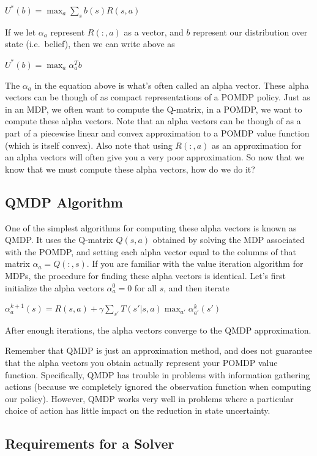 \documentclass[12pt,]{article}
\begin{document}
\(U^{*}(b) = \max_{a} \sum_{s} b(s)R(s,a)\)

If we let \(\alpha_{a}\) represent \(R(:,a)\) as a vector, and \(b\)
represent our distribution over state (i.e.~belief), then we can write
above as

\(U^{*}(b) = \max_{a} \alpha_{a}^{T}b\)

The \(\alpha_{a}\) in the equation above is what's often called an alpha
vector. These alpha vectors can be though of as compact representations
of a POMDP policy. Just as in an MDP, we often want to compute the
Q-matrix, in a POMDP, we want to compute these alpha vectors. Note that
an alpha vectors can be though of as a part of a piecewise linear and
convex approximation to a POMDP value function (which is itself convex).
Also note that using \(R(:,a)\) as an approximation for an alpha vectors
will often give you a very poor approximation. So now that we know that
we must compute these alpha vectors, how do we do it?

\subsection{QMDP Algorithm}\label{qmdp-algorithm}

One of the simplest algorithms for computing these alpha vectors is
known as QMDP. It uses the Q-matrix \(Q(s,a)\) obtained by solving the
MDP associated with the POMDP, and setting each alpha vector equal to
the columns of that matrix \(\alpha_{a} = Q(:, s)\). If you are familiar
with the value iteration algorithm for MDPs, the procedure for finding
these alpha vectors is identical. Let's first initialize the alpha
vectors \(\alpha_{a}^{0} = 0\) for all \(s\), and then iterate

\(\alpha_{a}^{k+1}(s) = R(s,a) + \gamma \sum_{s'} T(s'|s,a) \max_{a'} \alpha_{a'}^{k}(s')\)

After enough iterations, the alpha vectors converge to the QMDP
approximation.

Remember that QMDP is just an approximation method, and does not
guarantee that the alpha vectors you obtain actually represent your
POMDP value function. Specifically, QMDP has trouble in problems with
information gathering actions (because we completely ignored the
observation function when computing our policy). However, QMDP works
very well in problems where a particular choice of action has little
impact on the reduction in state uncertainty.

\subsection{Requirements for a Solver}\label{requirements-for-a-solver}
\end{document}

